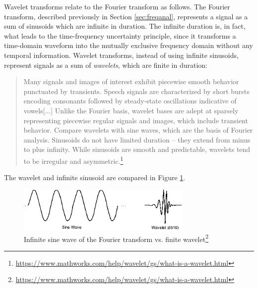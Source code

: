 \documentclass[report.tex]{subfiles}
\begin{document}
Wavelet transforms relate to the Fourier transform as follows. The Fourier transform, described previously in Section \ref{sec:freqanal}, represents a signal as a sum of sinusoids which are infinite in duration. The infinite duration is, in fact, what leads to the time-frequency uncertainty principle, since it transforms a time-domain waveform into the mutually exclusive frequency domain without any temporal information. Wavelet transforms, instead of using infinite sinusoids, represent signals as a sum of \textit{wavelets}, which are finite in duration:

\begin{quote}
       Many signals and images of interest exhibit piecewise smooth behavior punctuated by transients. Speech signals are characterized by short bursts encoding consonants followed by steady-state oscillations indicative of vowels[...] Unlike the Fourier basis, wavelet bases are adept at sparsely representing piecewise regular signals and images, which include transient behavior. Compare wavelets with sine waves, which are the basis of Fourier analysis. Sinusoids do not have limited duration -- they extend from minus to plus infinity. While sinusoids are smooth and predictable, wavelets tend to be irregular and asymmetric.\footnote{\url{https://www.mathworks.com/help/wavelet/gs/what-is-a-wavelet.html}}
\end{quote}

The wavelet and infinite sinusoid are compared in Figure \ref{fig:waveletinf}.

\begin{figure}[ht]
       \centering
        \begin{minipage}{1.\textwidth}
               \renewcommand\footnoterule{} %
               \renewcommand{\thempfootnote}{\fnsymbol{mpfootnote}}
               \includegraphics[width=0.75\textwidth]{./images-wavelets/wavelet.png}
               \caption[Infinite sine wave of the Fourier transform vs. finite wavelet]{Infinite sine wave of the Fourier transform vs. finite wavelet\footnote[1]{\url{https://www.mathworks.com/help/wavelet/gs/what-is-a-wavelet.html}}}
               \label{fig:waveletinf}
       \end{minipage}
\end{figure}
\end{document}
